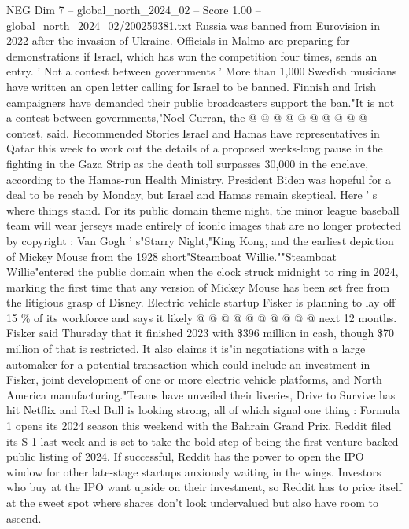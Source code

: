 \begin{textsample}{NEG Dim 7 – global\_north\_2024\_02 – Score 1.00 – global\_north\_2024\_02/200259381.txt}
Russia was banned from Eurovision in 2022 after the invasion of Ukraine.
Officials in Malmo are preparing for demonstrations if Israel, which has won the competition four times, sends an entry. ' Not a contest between governments ' More than 1,000 Swedish musicians have written an open letter calling for Israel to be banned.
Finnish and Irish campaigners have demanded their public broadcasters support the ban."It is not a contest between governments,"Noel Curran, the @ @ @ @ @ @ @ @ @ @ contest, said.
Recommended Stories Israel and Hamas have representatives in Qatar this week to work out the details of a proposed weeks-long pause in the fighting in the Gaza Strip as the death toll surpasses 30,000 in the enclave, according to the Hamas-run Health Ministry.
President Biden was hopeful for a deal to be reach by Monday, but Israel and Hamas remain skeptical.
Here ' s where things stand.
For its public domain theme night, the minor league baseball team will wear jerseys made entirely of iconic images that are no longer protected by copyright : Van Gogh ' s"Starry Night,"King Kong, and the earliest depiction of Mickey Mouse from the 1928 short"Steamboat Willie.""Steamboat Willie"entered the public domain when the clock struck midnight to ring in 2024, marking the first time that any version of Mickey Mouse has been set free from the litigious grasp of Disney.
Electric vehicle startup Fisker is planning to lay off 15 \% of its workforce and says it likely @ @ @ @ @ @ @ @ @ @ next 12 months.
Fisker said Thursday that it finished 2023 with \$396 million in cash, though \$70 million of that is restricted.
It also claims it is"in negotiations with a large automaker for a potential transaction which could include an investment in Fisker, joint development of one or more electric vehicle platforms, and North America manufacturing."Teams have unveiled their liveries, Drive to Survive has hit Netflix and Red Bull is looking strong, all of which signal one thing : Formula 1 opens its 2024 season this weekend with the Bahrain Grand Prix.
Reddit filed its S-1 last week and is set to take the bold step of being the first venture-backed public listing of 2024.
If successful, Reddit has the power to open the IPO window for other late-stage startups anxiously waiting in the wings.
Investors who buy at the IPO want upside on their investment, so Reddit has to price itself at the sweet spot where shares don't look undervalued but also have room to ascend.

\end{textsample}
